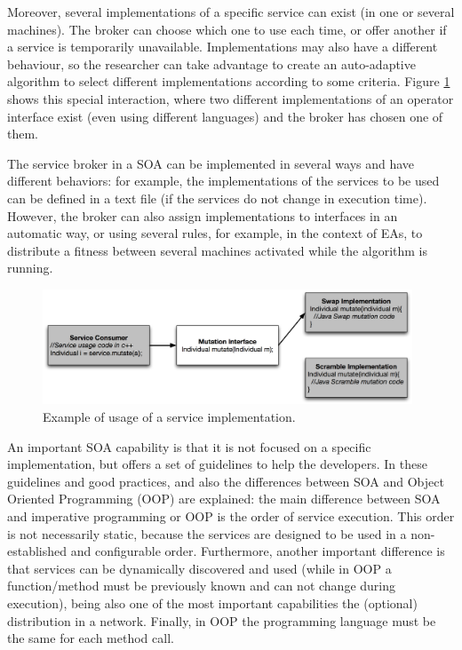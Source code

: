 Moreover, several implementations of a specific service  can exist (in one or several machines). The broker can choose which one to use  each time, or offer another if a service is temporarily unavailable. Implementations  may also have a different behaviour, so the researcher can take advantage to create an auto-adaptive algorithm to select different implementations according to some criteria. Figure \ref{fig:servicebasic} shows this special interaction, where two different implementations of an operator interface exist (even using different languages) and the broker has chosen one of them.


The service broker in a SOA can be implemented in several ways and have
different behaviors: for example, the implementations of the services to be used can be
defined in a text file (if the services do not change in execution
time). However, the broker can also assign implementations to
interfaces in an automatic way, or using several rules, for example, in the context of EAs,
to distribute a fitness between several machines activated while the
algorithm is running. 


\begin{figure}
\centering
\includegraphics[width=26pc]{gfx/soa/exampleSOA.jpg}
\caption{Example of usage of a service implementation.}
\label{fig:servicebasic}
\end{figure}




An important SOA capability is that it is not focused on a specific
implementation, but offers a set of guidelines to help the
developers. In \citep{Arsanjani2008SOMA} these guidelines and good practices, and also the differences between SOA and Object Oriented
Programming (OOP) are
explained: the main difference between SOA and imperative programming or OOP is the order of service execution. This order is not necessarily static, because the services are designed to be used in a non-established and configurable order. Furthermore, another important difference is that services can be dynamically discovered and used (while in OOP a function/method must be previously known and can not change during execution), being also one of the most important capabilities the (optional) distribution in a network. Finally, in OOP the programming language must be the same for each method call.

